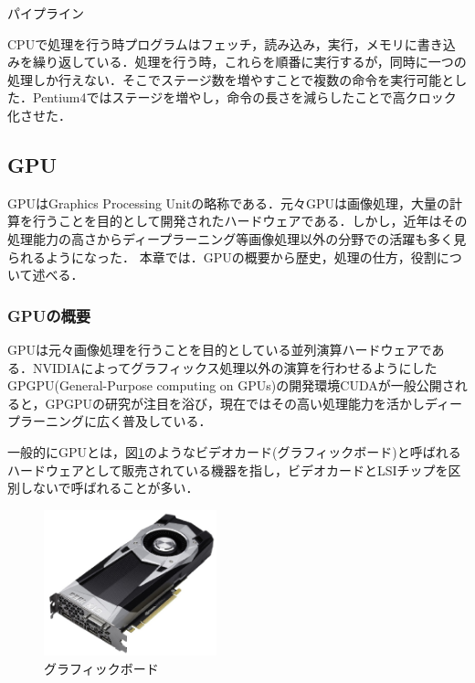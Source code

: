 \documentclass[a4j,12pt]{jsarticle}
\begin{document}
\begin{Large}
パイプライン
\end {Large}

CPUで処理を行う時プログラムはフェッチ，読み込み，実行，メモリに書き込みを繰り返している．処理を行う時，これらを順番に実行するが，同時に一つの処理しか行えない．そこでステージ数を増やすことで複数の命令を実行可能とした．Pentium4ではステージを増やし，命令の長さを減らしたことで高クロック化させた．


\subsection{GPU}
GPUはGraphics Processing Unitの略称である．元々GPUは画像処理，大量の計算を行うことを目的として開発されたハードウェアである．しかし，近年はその処理能力の高さからディープラーニング等画像処理以外の分野での活躍も多く見られるようになった．
本章では．GPUの概要から歴史，処理の仕方，役割について述べる．


\subsubsection{GPUの概要}
GPUは元々画像処理を行うことを目的としている並列演算ハードウェアである．NVIDIAによってグラフィックス処理以外の演算を行わせるようにしたGPGPU(General-Purpose computing on GPUs)の開発環境CUDAが一般公開されると，GPGPUの研究が注目を浴び，現在ではその高い処理能力を活かしディープラーニングに広く普及している．

一般的にGPUとは，図\ref{fig:gpu}のようなビデオカード(グラフィックボード)と呼ばれるハードウェアとして販売されている機器を指し，ビデオカードとLSIチップを区別しないで呼ばれることが多い．

\begin{figure}[htbp]
 \begin{center}
  \includegraphics[width=50mm]{GPU.pdf}
 \end{center}
 \caption{グラフィックボード}
 \label{fig:gpu}
\end{figure}
\end{document}

